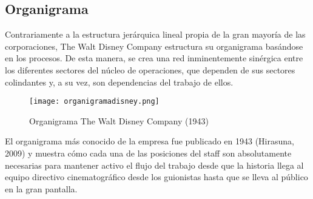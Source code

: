 \subsection{Organigrama}

Contrariamente a la estructura jerárquica lineal propia de la gran mayoría de las corporaciones, The Walt Disney Company estructura su organigrama basándose en los procesos. De esta manera, se crea una red inminentemente sinérgica entre los diferentes sectores del núcleo de operaciones, que dependen de sus sectores colindantes y, a su vez, son dependencias del trabajo de ellos.

\begin{figure}[!htb]
\centering
\texttt{[image: organigramadisney.png]}
\caption{\label{fig:frog}Organigrama The Walt Disney Company (1943)}
\end{figure}

El organigrama más conocido de la empresa fue publicado en 1943 (Hirasuna, 2009) y muestra cómo cada una de las posiciones del staff son absolutamente necesarias para mantener activo el flujo del trabajo desde que la historia llega al equipo directivo cinematográfico desde los guionistas hasta que se lleva al público en la gran pantalla.